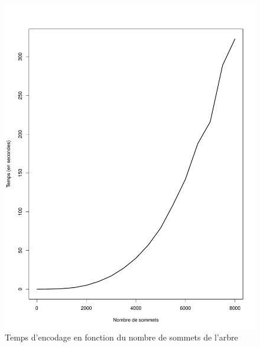 \documentclass[a4paper, 11pt, oneside]{article}
\begin{document}
\begin{figure}[H]
	\centering
	\includegraphics[scale=0.5]{temps_encodage.pdf} 
	\caption{Temps d'encodage en fonction du nombre de sommets de l'arbre}
\end{figure}
\end{document}
